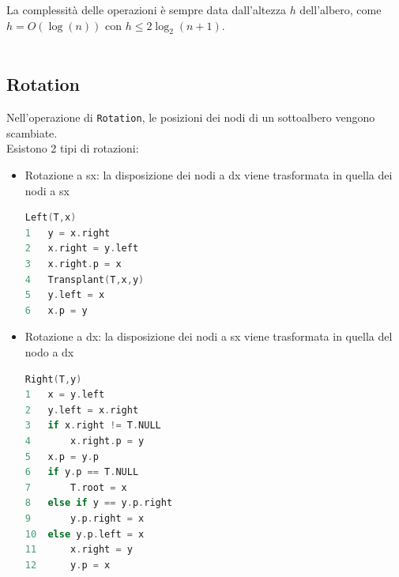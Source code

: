La complessità delle operazioni è sempre data dall'altezza $h$ dell'albero, come $h = O(\log(n))$ con $h \leq 2 \log_2 (n+1)$. \\~\\

\subsection{Rotation}
Nell'operazione di \verb|Rotation|, le posizioni dei nodi di un sottoalbero vengono scambiate. \\
Esistono 2 tipi di rotazioni:
\begin{itemize}
    \item Rotazione a sx: la disposizione dei nodi a dx viene trasformata in quella dei nodi a sx
\begin{mdframed}
\begin{lstlisting}[language=C]
Left(T,x)
1   y = x.right
2   x.right = y.left
3   x.right.p = x
4   Transplant(T,x,y)
5   y.left = x
6   x.p = y
\end{lstlisting}
\end{mdframed}
    \item Rotazione a dx: la disposizione dei nodi a sx viene trasformata in quella del nodo a dx
\begin{mdframed}
\begin{lstlisting}[language=C]
Right(T,y)
1   x = y.left
2   y.left = x.right
3   if x.right != T.NULL
4       x.right.p = y
5   x.p = y.p
6   if y.p == T.NULL
7       T.root = x
8   else if y == y.p.right
9       y.p.right = x
10  else y.p.left = x
11      x.right = y
12      y.p = x
\end{lstlisting}
\end{mdframed}
\end{itemize}
